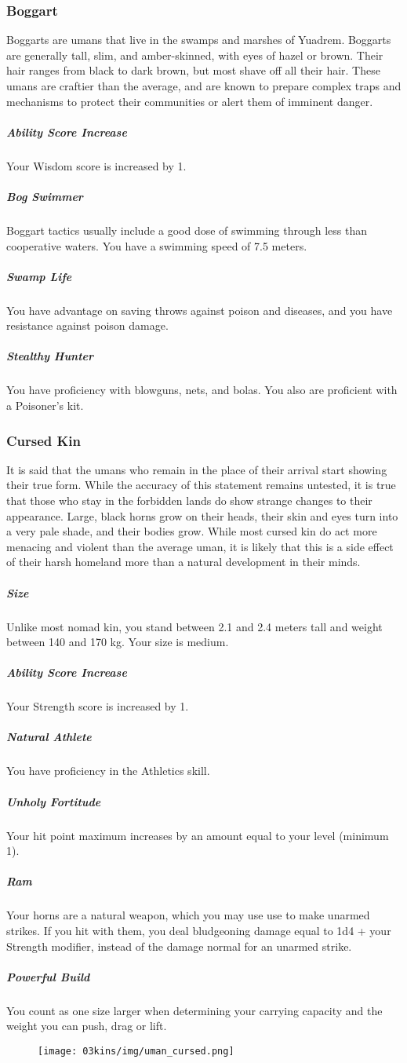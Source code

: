 \begin{linenumbers}
\subsubsection{Boggart}
Boggarts are umans that live in the swamps and marshes of Yuadrem.
Boggarts are generally tall, slim, and amber-skinned, with eyes of hazel or brown.
Their hair ranges from black to dark brown, but most shave off all their hair.
These umans are craftier than the average, and are known to prepare complex traps and mechanisms to protect their communities or alert them of imminent danger.
\subparagraph{Ability Score Increase} Your Wisdom score is increased by 1.
\subparagraph{Bog Swimmer} Boggart tactics usually include a good dose of swimming through less than cooperative waters.
You have a swimming speed of 7.5 meters.
\subparagraph{Swamp Life} You have advantage on saving throws against poison and diseases, and you have resistance against poison damage.
\subparagraph{Stealthy Hunter} You have proficiency with blowguns, nets, and bolas.
You also are proficient with a Poisoner's kit.

\subsubsection{Cursed Kin}
It is said that the umans who remain in the place of their arrival start showing their true form.
While the accuracy of this statement remains untested, it is true that those who stay in the forbidden lands do show strange changes to their appearance.
Large, black horns grow on their heads, their skin and eyes turn into a very pale shade, and their bodies grow.
While most cursed kin do act more menacing and violent than the average uman, it is likely that this is a side effect of their harsh homeland more than a natural development in their minds.
\subparagraph{Size} Unlike most nomad kin, you stand between 2.1 and 2.4 meters tall and weight between 140 and 170 kg.
Your size is medium.
\subparagraph{Ability Score Increase} Your Strength score is increased by 1.
\subparagraph{Natural Athlete} You have proficiency in the Athletics skill.
\subparagraph{Unholy Fortitude} Your hit point maximum increases by an amount equal to your level (minimum 1).
\subparagraph{Ram} Your horns are a natural weapon, which you may use use to make unarmed strikes.
If you hit with them, you deal bludgeoning damage equal to 1d4 + your Strength modifier, instead of the damage normal for an unarmed strike.
\subparagraph{Powerful Build} You count as one size larger when determining your carrying capacity and the weight you can push, drag or lift.

\begin{figure}[!b]
    \centering
    \texttt{[image: 03kins/img/uman\_cursed.png]}
\end{figure}
\end{linenumbers}

